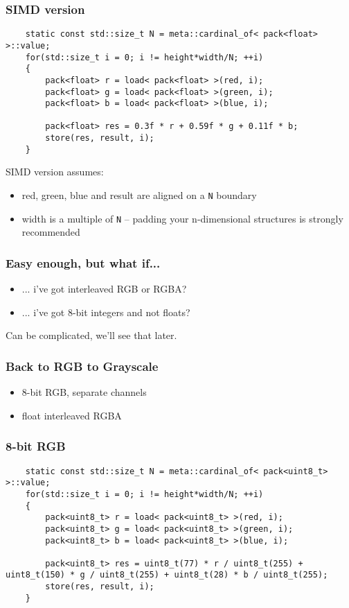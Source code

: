 \documentclass{beamer}
\begin{document}
\begin{frame}[fragile]
	\frametitle{SIMD version}
	
	\begin{lstlisting}
	static const std::size_t N = meta::cardinal_of< pack<float> >::value;
	for(std::size_t i = 0; i != height*width/N; ++i)
	{
	    pack<float> r = load< pack<float> >(red, i);
	    pack<float> g = load< pack<float> >(green, i);
	    pack<float> b = load< pack<float> >(blue, i);
		
	    pack<float> res = 0.3f * r + 0.59f * g + 0.11f * b;
	    store(res, result, i);
	}
	\end{lstlisting}
	
	SIMD version assumes:
	\begin{itemize}
		\item red, green, blue and result are aligned on a \lstinline{N} boundary
		\item width is a multiple of \lstinline{N} -- padding your n-dimensional structures is strongly recommended
	\end{itemize}

\end{frame}

\begin{frame}
	\frametitle{Easy enough, but what if...}

	\begin{itemize}
		\item ... i've got interleaved RGB or RGBA?
		\item ... i've got 8-bit integers and not floats?
	\end{itemize}
	
	Can be complicated, we'll see that later.
	
\end{frame}





\begin{frame}
	\frametitle{Back to RGB to Grayscale}
	
	\begin{itemize}
		\item 8-bit RGB, separate channels
		\item float interleaved RGBA
	\end{itemize}
	
\end{frame}

\begin{frame}[fragile]
	\frametitle{8-bit RGB}
	
	\begin{lstlisting}
	static const std::size_t N = meta::cardinal_of< pack<uint8_t> >::value;
	for(std::size_t i = 0; i != height*width/N; ++i)
	{
	    pack<uint8_t> r = load< pack<uint8_t> >(red, i);
	    pack<uint8_t> g = load< pack<uint8_t> >(green, i);
	    pack<uint8_t> b = load< pack<uint8_t> >(blue, i);
		
	    pack<uint8_t> res = uint8_t(77) * r / uint8_t(255) + uint8_t(150) * g / uint8_t(255) + uint8_t(28) * b / uint8_t(255);
	    store(res, result, i);
	}
	\end{lstlisting}
\end{frame}
\end{document}
